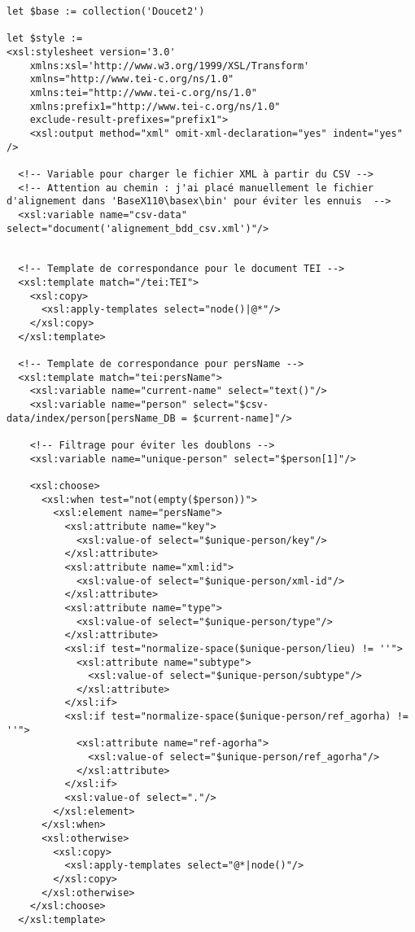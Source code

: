 \begin{verbatim}
let $base := collection('Doucet2')

let $style :=
<xsl:stylesheet version='3.0'
    xmlns:xsl='http://www.w3.org/1999/XSL/Transform'
    xmlns="http://www.tei-c.org/ns/1.0"
    xmlns:tei="http://www.tei-c.org/ns/1.0"
    xmlns:prefix1="http://www.tei-c.org/ns/1.0"
    exclude-result-prefixes="prefix1">       
    <xsl:output method="xml" omit-xml-declaration="yes" indent="yes" />

  <!-- Variable pour charger le fichier XML à partir du CSV -->
  <!-- Attention au chemin : j'ai placé manuellement le fichier d'alignement dans 'BaseX110\basex\bin' pour éviter les ennuis  -->
  <xsl:variable name="csv-data" select="document('alignement_bdd_csv.xml')"/>


  <!-- Template de correspondance pour le document TEI -->
  <xsl:template match="/tei:TEI">
    <xsl:copy>
      <xsl:apply-templates select="node()|@*"/>
    </xsl:copy>
  </xsl:template>

  <!-- Template de correspondance pour persName -->
  <xsl:template match="tei:persName">
    <xsl:variable name="current-name" select="text()"/>
    <xsl:variable name="person" select="$csv-data/index/person[persName_DB = $current-name]"/>
    
    <!-- Filtrage pour éviter les doublons -->
    <xsl:variable name="unique-person" select="$person[1]"/>
    
    <xsl:choose>
      <xsl:when test="not(empty($person))">
        <xsl:element name="persName">
          <xsl:attribute name="key">
            <xsl:value-of select="$unique-person/key"/>
          </xsl:attribute>
          <xsl:attribute name="xml:id">
            <xsl:value-of select="$unique-person/xml-id"/>
          </xsl:attribute>
          <xsl:attribute name="type">
            <xsl:value-of select="$unique-person/type"/>
          </xsl:attribute>
          <xsl:if test="normalize-space($unique-person/lieu) != ''">
            <xsl:attribute name="subtype">
              <xsl:value-of select="$unique-person/subtype"/>
            </xsl:attribute>
          </xsl:if>
          <xsl:if test="normalize-space($unique-person/ref_agorha) != ''">
            <xsl:attribute name="ref-agorha">
              <xsl:value-of select="$unique-person/ref_agorha"/>
            </xsl:attribute>
          </xsl:if>
          <xsl:value-of select="."/>
        </xsl:element>
      </xsl:when>
      <xsl:otherwise>
        <xsl:copy>
          <xsl:apply-templates select="@*|node()"/>
        </xsl:copy>
      </xsl:otherwise>
    </xsl:choose>
  </xsl:template>


\end{verbatim}
